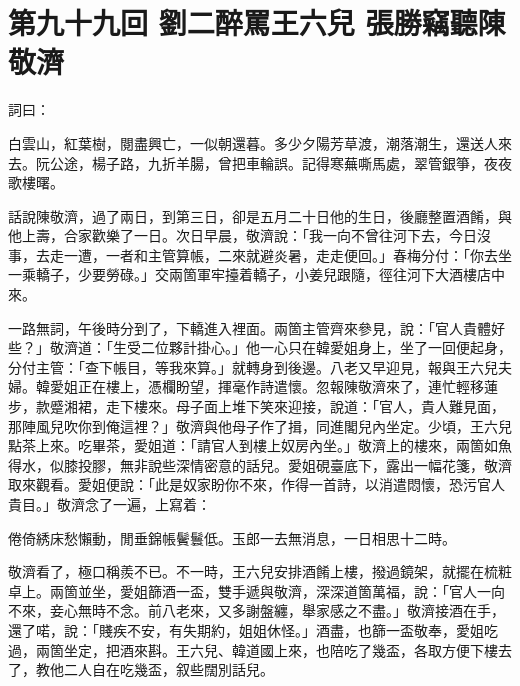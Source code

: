 
\chapter*{第九十九回 劉二醉罵王六兒 張勝竊聽陳敬濟}


詞曰：

\begin{myquote}
白雲山，紅葉樹，閱盡興亡，一似朝還暮。多少夕陽芳草渡，潮落潮生，還送人來去。阮公途，楊子路，九折羊腸，曾把車輪誤。記得寒蕪嘶馬處，翠管銀箏，夜夜歌樓曙。

\end{myquote}

話說陳敬濟，過了兩日，到第三日，卻是五月二十日他的生日，後廳整置酒餚，與他上壽，合家歡樂了一日。次日早晨，敬濟說：「我一向不曾往河下去，今日沒事，去走一遭，一者和主管算帳，二來就避炎暑，走走便回。」春梅分付：「你去坐一乘轎子，少要勞碌。」交兩箇軍牢擡着轎子，小姜兒跟隨，徑往河下大酒樓店中來。

一路無詞，午後時分到了，下轎進入裡面。兩箇主管齊來參見，說：「官人貴體好些？」敬濟道：「生受二位夥計掛心。」他一心只在韓愛姐身上，坐了一回便起身，分付主管：「查下帳目，等我來算。」就轉身到後邊。八老又早迎見，報與王六兒夫婦。韓愛姐正在樓上，憑欄盼望，揮毫作詩遣懷。忽報陳敬濟來了，連忙輕移蓮步，款蹙湘裙，走下樓來。母子面上堆下笑來迎接，說道：「官人，貴人難見面，那陣風兒吹你到俺這裡？」敬濟與他母子作了揖，同進閣兒內坐定。少頃，王六兒點茶上來。吃畢茶，愛姐道：「請官人到樓上奴房內坐。」敬濟上的樓來，兩箇如魚得水，似膝投膠，無非說些深情密意的話兒。愛姐硯臺底下，露出一幅花箋，敬濟取來觀看。愛姐便說：「此是奴家盼你不來，作得一首詩，以消遣悶懷，恐污官人貴目。」敬濟念了一遍，上寫着：

\begin{myquote}[\markfont]
倦倚綉床愁懶動，閒垂錦帳鬢鬟低。玉郎一去無消息，一日相思十二時。
\end{myquote}

敬濟看了，極口稱羨不已。不一時，王六兒安排酒餚上樓，撥過鏡架，就擺在梳粧卓上。兩箇並坐，愛姐篩酒一盃，雙手遞與敬濟，深深道箇萬福，說：「官人一向不來，妾心無時不念。前八老來，又多謝盤纏，舉家感之不盡。」敬濟接酒在手，還了喏，說：「賤疾不安，有失期約，姐姐休怪。」酒盡，也篩一盃敬奉，愛姐吃過，兩箇坐定，把酒來斟。王六兒、韓道國上來，也陪吃了幾盃，各取方便下樓去了，{}教他二人自在吃幾盃，叙些闊別話兒。


